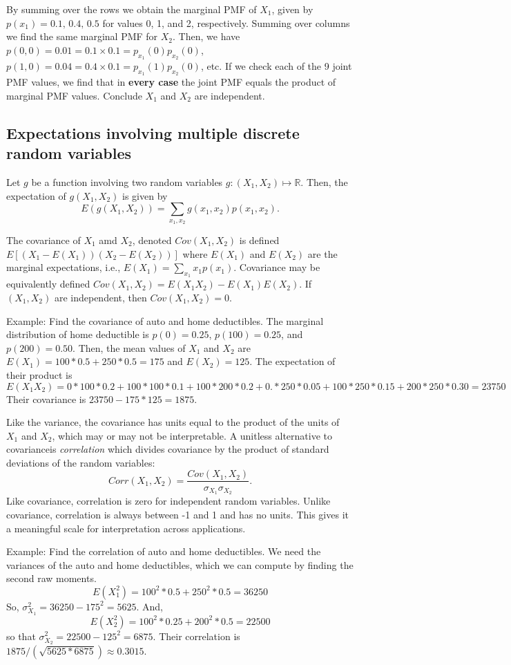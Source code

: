 \documentclass[]{book}
\begin{document}
By summing over the rows we obtain the marginal PMF of \(X_1\), given by
\(p(x_1) = 0.1,\, 0.4,\, 0.5\) for values \(0\), 1, and 2, respectively.
Summing over columns we find the same marginal PMF for \(X_2\). Then, we
have \(p(0,0) = 0.01 = 0.1\times 0.1 = p_{x_1}(0)p_{x_2}(0)\),
\(p(1,0) = 0.04 = 0.4\times 0.1 = p_{x_1}(1)p_{x_2}(0)\), etc. If we
check each of the 9 joint PMF values, we find that in \textbf{every
case} the joint PMF equals the product of marginal PMF values. Conclude
\(X_1\) and \(X_2\) are independent.

\subsection{Expectations involving multiple discrete random
variables}\label{expectations-involving-multiple-discrete-random-variables}

Let \(g\) be a function involving two random variables
\(g:(X_1,X_2)\mapsto \mathbb{R}\). Then, the expectation of
\(g(X_1,X_2)\) is given by
\[E(g(X_1,X_2)) = \sum_{x_1,x_2} g(x_1,x_2)p(x_1,x_2).\]

The covariance of \(X_1\) amd \(X_2\), denoted \(Cov(X_1,X_2)\) is
defined \(E[(X_1 - E(X_1))(X_2 - E(X_2))]\) where \(E(X_1)\) and
\(E(X_2)\) are the marginal expectations, i.e.,
\(E(X_1) = \sum_{x_1} x_1 p(x_1)\). Covariance may be equivalently
defined \(Cov(X_1, X_2) = E(X_1X_2)-E(X_1)E(X_2)\). If \((X_1,X_2)\) are
independent, then \(Cov(X_1,X_2) = 0\).

Example: Find the covariance of auto and home deductibles. The marginal
distribution of home deductible is \(p(0) = 0.25\), \(p(100) = 0.25\),
and \(p(200) = 0.50\). Then, the mean values of \(X_1\) and \(X_2\) are
\(E(X_1) = 100*0.5 + 250 * 0.5 = 175\) and \(E(X_2) = 125\). The
expectation of their product is
\[E(X_1X_2) = 0*100*0.2 + 100*100*0.1 + 100*200*0.2 + 0.*250*0.05 + 100*250*0.15 + 200*250*0.30=23750\]
Their covariance is \(23750-175*125 = 1875\).

Like the variance, the covariance has units equal to the product of the
units of \(X_1\) and \(X_2\), which may or may not be interpretable. A
unitless alternative to covarianceis \emph{correlation} which divides
covariance by the product of standard deviations of the random
variables:
\[Corr(X_1, X_2) = \frac{Cov(X_1,X_2)}{\sigma_{X_1}\sigma_{X_2}}.\] Like
covariance, correlation is zero for independent random variables. Unlike
covariance, correlation is always between -1 and 1 and has no units.
This gives it a meaningful scale for interpretation across applications.

Example: Find the correlation of auto and home deductibles. We need the
variances of the auto and home deductibles, which we can compute by
finding the second raw moments.
\[E(X_1^2) = 100^2*0.5 + 250^2 * 0.5 = 36250\] So,
\(\sigma_{X_1}^2 = 36250-175^2 = 5625\). And,
\[E(X_2^2) = 100^2*0.25 + 200^2 * 0.5 = 22500\] so that
\(\sigma_{X_2}^2 = 22500 - 125^2 = 6875\). Their correlation is
\(1875/(\sqrt{5625*6875}) \approx 0.3015\).


\end{document}

